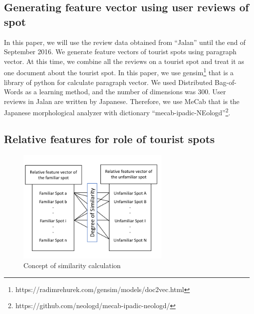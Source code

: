 \documentclass[journal]{IAENGtran}
\begin{document}
\subsection{Generating feature vector using user reviews of spot}
\label{subsec:Generating feature vector using user reviews of spot}
In this paper, we will use the review data obtained from ``Jalan'' until the end of September 2016.
We generate feature vectors of tourist spots using paragraph vector\cite{Codd10}.
At this time, we combine all the reviews on a tourist spot and treat it as one document about the tourist spot.
In this paper, we use gensim\footnote{https://radimrehurek.com/gensim/models/doc2vec.html} that is a library of python for calculate paragraph vector.
We used Distributed Bag-of-Words as a learning method, and the number of dimensions was 300.
User reviews in Jalan are written by Japanese.
Therefore, we use MeCab\cite{Codd11} that is the Japanese morphological analyzer with dictionary ``mecab-ipadic-NEologd''\footnote{https://github.com/neologd/mecab-ipadic-neologd/}.

\subsection{Relative features for role of tourist spots}
\label{subsec:Relative features of tourist spots}

\begin{figure}[t]
  \begin{center}
    \includegraphics[clip,width=7.5cm,bb=0 0 720 540]{picture/Photo_CosSim_eng.png}
    \caption{Concept of similarity calculation}
    \label{fig:Photo_CosSim}
  \end{center}
\end{figure}
\end{document}
